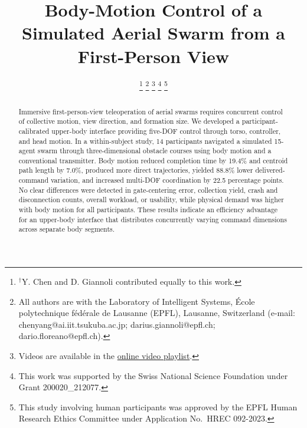 \documentclass[a4paper,10pt,conference]{ieeeconf}
\title{\LARGE \bf
Body-Motion Control of a Simulated Aerial Swarm from a First-Person View}
\author{
\authorblockN{
Yang Chen$^{\dagger}$,
Darius Giannoli$^{\dagger}$, and
Dario Floreano,
\IEEEmembership{Fellow, IEEE}
}
\thanks{$^{\dagger}$Y. Chen and D. Giannoli contributed equally to this work.}%
\thanks{All authors are with the Laboratory of Intelligent Systems,
\'{E}cole polytechnique f\'{e}d\'{e}rale de Lausanne (EPFL),
Lausanne, Switzerland (e-mail: chenyang@ai.iit.tsukuba.ac.jp;
darius.giannoli@epfl.ch; dario.floreano@epfl.ch).}%
\thanks{Videos are available in the
\protect\href{https://www.youtube.com/playlist?list=PLTn4QPxGFMEU}
{online video playlist}.}%
\thanks{This work was supported by the Swiss National Science Foundation
under Grant 200020\_212077.}%
\thanks{This study involving human participants was approved by the EPFL
Human Research Ethics Committee under Application No.\ HREC 092-2023.}%
}
\begin{document}
\maketitle
\thispagestyle{empty}
\pagestyle{empty}



\begin{abstract}
Immersive first-person-view teleoperation of aerial swarms requires concurrent
control of collective motion, view direction, and formation size. We developed
a participant-calibrated upper-body interface providing five-DOF control
through torso, controller, and head motion. In a within-subject study, 14
participants navigated a simulated 15-agent swarm through three-dimensional
obstacle courses using body motion and a conventional transmitter. Body motion
reduced completion time by 19.4\% and centroid path length by 7.0\%, produced
more direct trajectories, yielded 88.8\% lower delivered-command variation, and
increased multi-DOF coordination by 22.5 percentage points. No clear
differences were detected in gate-centering error, collection yield, crash and
disconnection counts, overall workload, or usability, while physical demand was
higher with body motion for all participants. These results indicate an
efficiency advantage for an upper-body interface that distributes concurrently
varying command dimensions across separate body segments.
\end{abstract}


\end{document}
